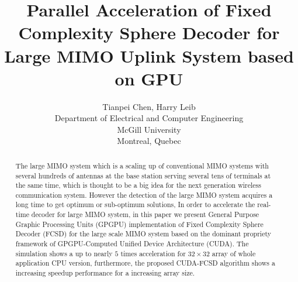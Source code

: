 \documentclass[12pt,a4paper,final]{article}
\title{Parallel Acceleration of Fixed Complexity Sphere Decoder for Large MIMO Uplink System based on GPU}
\author{Tianpei Chen, Harry Leib\\
 Department of Electrical and Computer Engineering\\
 McGill University\\
 Montreal, Quebec}
\begin{document}
\begin{spacing}{2.5}
\maketitle

\begin{abstract}
The large MIMO system which is a scaling up of conventional MIMO systems with several hundreds of antennas at the base station serving several tens of terminals at the same time,  which is thought to be a big idea for the next generation wireless communication system. However the detection of the large MIMO system acquires a long time to get optimum or sub-optimum solutions, In order to accelerate the real-time decoder for large MIMO system, in this paper we present General Purpose Graphic Processing Units (GPGPU) implementation of Fixed Complexity Sphere Decoder (FCSD) for the large scale MIMO system based on the dominant propriety framework of GPGPU-Computed Unified Device Architecture (CUDA). The simulation shows a up to nearly $5$ times acceleration for $32\times 32$ array of whole application CPU version, furthermore, the proposed CUDA-FCSD algorithm shows a increasing speedup performance for a increasing array size. 
\end{abstract}





%


\end{spacing}
\end{document}
